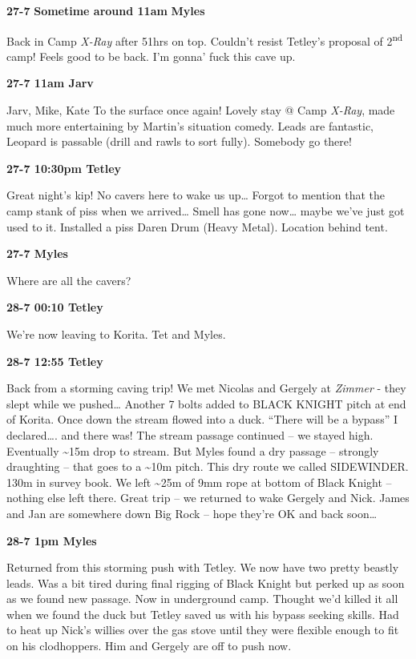 \textbf{27-7} \textbf{Sometime around 11am} \textbf{Myles}

Back in Camp \emph{X-Ray} after 51hrs on top. Couldn't resist Tetley's
proposal of 2\textsuperscript{nd} camp! Feels good to be back. I'm
gonna' fuck this cave up.

\textbf{27-7 11am Jarv}

Jarv, Mike, Kate To the surface once again! Lovely stay @ Camp
\emph{X-Ray}, made much more entertaining by Martin's situation comedy.
Leads are fantastic, Leopard is passable (drill and rawls to sort
fully). Somebody go there!

\textbf{27-7 10:30pm Tetley}

Great night's kip! No cavers here to wake us up\ldots{} Forgot to
mention that the camp stank of piss when we arrived\ldots{} Smell has
gone now\ldots{} maybe we've just got used to it. Installed a piss Daren
Drum (Heavy Metal). Location behind tent.

\textbf{27-7 Myles}

Where are all the cavers?

\textbf{28-7 00:10 Tetley}

We're now leaving to Korita. Tet and Myles.

\textbf{28-7 12:55 Tetley}

Back from a storming caving trip! We met Nicolas and Gergely at
\emph{Zimmer} - they slept while we pushed\ldots{} Another 7 bolts added
to BLACK KNIGHT pitch at end of Korita. Once down the stream flowed into
a duck. ``There will be a bypass'' I declared\ldots{}. and there was!
The stream passage continued -- we stayed high. Eventually
\textasciitilde{}15m drop to stream. But Myles found a dry passage --
strongly draughting -- that goes to a \textasciitilde{}10m pitch. This
dry route we called SIDEWINDER. 130m in survey book. We left
\textasciitilde{}25m of 9mm rope at bottom of Black Knight -- nothing
else left there. Great trip -- we returned to wake Gergely and Nick.
James and Jan are somewhere down Big Rock -- hope they're OK and back
soon\ldots{}

\textbf{28-7 1pm Myles}

Returned from this storming push with Tetley. We now have two pretty
beastly leads. Was a bit tired during final rigging of Black Knight but
perked up as soon as we found new passage. Now in underground camp.
Thought we'd killed it all when we found the duck but Tetley saved us
with his bypass seeking skills. Had to heat up Nick's willies over the
gas stove until they were flexible enough to fit on his clodhoppers. Him
and Gergely are off to push now.

